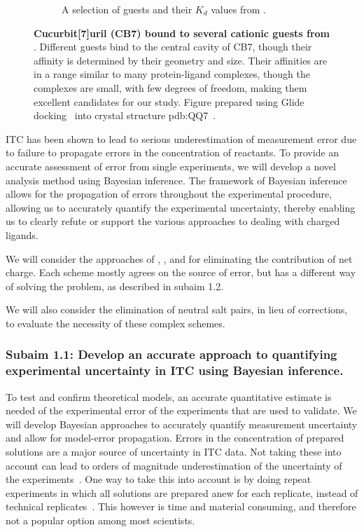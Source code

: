 \documentclass[10pt,final]{article}
\begin{document}
\begin{figure}[H]
\begin{subfigure}{.5\textwidth}
  \caption{A selection of guests and their $K_d$ values from \textcite{Cao2013a}.}
  \label{fig:sub2}
\end{subfigure}
\caption{\textbf{Cucurbit[7]uril (CB7) bound to several cationic guests from \textcite{Cao2013a}}. Different guests bind to the central cavity of CB7, though their affinity is determined by their geometry and size. Their affinities are in a range similar to many protein-ligand complexes, though the complexes are small, with few degrees of freedom, making them excellent candidates for our study. Figure prepared using Glide docking~\cite{Halgren2004a,Friesner2004a,Friesner2006a,Schroedinger2014a} into crystal structure pdb:QQ7~\cite{Feng2004a}.}
\label{figure:host-guest}
\end{figure}

ITC has been shown to lead to serious underestimation of measurement error due to failure to propagate errors in the concentration of reactants\cite{Myszka2003a,Tellinghuisen2011a}. To provide an accurate assessment of error from single experiments, we will develop a novel analysis method using Bayesian inference.
%
The framework of Bayesian inference allows for the propagation of errors throughout the experimental procedure, allowing us to accurately quantify the experimental uncertainty, thereby enabling us to clearly refute or support the various approaches to dealing with charged ligands.

We will consider the approaches of \textcite{Reif2013a}, \textcite{Rocklin2013a}, and \textcite{Lin2014a} for eliminating the contribution of net charge.  Each scheme mostly agrees on the source of error, but has a different way of solving the problem, as described in subaim 1.2. 

We will also consider the elimination of neutral salt pairs, in lieu of corrections, to evaluate the necessity of these complex schemes.


\subsubsection*{Subaim 1.1: Develop an accurate approach to quantifying experimental uncertainty in ITC using Bayesian inference.}
To test and confirm theoretical models, an accurate quantitative estimate is needed of the experimental error of the experiments that are used to validate.
%
We will develop Bayesian approaches to accurately quantify measurement uncertainty and allow for model-error propagation. 
Errors in the concentration of prepared solutions are a major source of uncertainty in ITC data. Not taking these into account can lead to orders of magnitude underestimation of the uncertainty of the experiments~\cite{Myszka2003a,Tellinghuisen2011a}.
One way to take this into account is by doing repeat experiments in which all solutions are prepared anew for each replicate, instead of technical replicates~\cite{Vaux2012a}. This however is time and material consuming, and therefore not a popular option among most scientists. 
\end{document}
